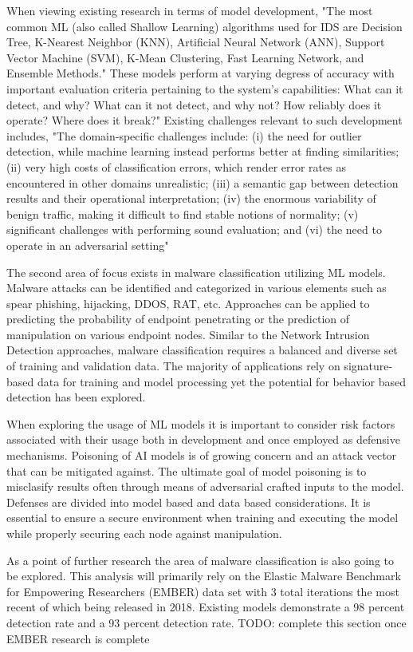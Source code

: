 When viewing existing research in terms of model development, "The most common ML (also called Shallow Learning) algorithms used for IDS are Decision Tree, K-Nearest Neighbor (KNN), Artificial Neural Network (ANN), Support Vector Machine (SVM), K-Mean Clustering, Fast Learning Network, and Ensemble Methods." \cite{nids1} These models perform at varying degress of accuracy with important evaluation criteria pertaining to the system’s capabilities: What can it detect, and why? What can it not detect, and why not? How reliably does it operate? Where does it break?"\cite{nids1} Existing challenges relevant to such development includes,  "The domain-specific challenges include: (i) the need for outlier detection, while machine learning instead performs better at finding similarities; (ii) very high costs of classification errors, which render error rates as encountered in other domains unrealistic; (iii) a semantic gap between detection results and their operational interpretation; (iv) the enormous variability of benign traffic, making it difficult to find stable notions of normality; (v) significant challenges with performing sound evaluation; and (vi) the need to operate in an adversarial setting" \cite{nids1}

The second area of focus exists in malware classification utilizing ML models. Malware attacks can be identified and categorized in various elements such as spear phishing, hijacking, DDOS, RAT, etc. Approaches can be applied to predicting the probability of endpoint penetrating or the prediction of manipulation on various endpoint nodes. Similar to the Network Intrusion Detection approaches, malware classification requires a balanced and diverse set of training and validation data. The majority of applications rely on signature-based data for training and model processing yet the potential for behavior based detection has been explored. 

When exploring the usage of ML models it is important to consider risk factors associated with their usage both in development and once employed as defensive mechanisms. Poisoning of AI models is of growing concern and an attack vector that can be mitigated against. The ultimate goal of model poisoning is to misclasify results often through means of adversarial crafted inputs to the model. Defenses are divided into model based and data based considerations. It is essential to ensure a secure environment when training and executing the model while properly securing each node against manipulation.

As a point of further research the area of malware classification is also going to be explored. This analysis will primarily rely on the Elastic Malware Benchmark for Empowering Researchers (EMBER) data set with 3 total iterations the most recent of which being released in 2018. Existing models demonstrate a 98 percent detection rate and a 93 percent detection rate. TODO: complete this section once EMBER research is complete